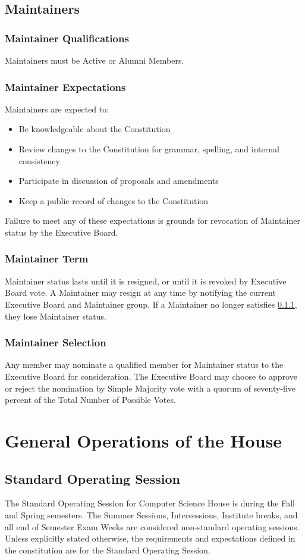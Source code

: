 \documentclass{article}
\newcommand{\article}[1]{\section{#1} \label{#1}}
\newcommand{\asection}[1]{\subsection{#1} \label{#1}}
\newcommand{\asubsection}[1]{\subsubsection{#1} \label{#1}}
\begin{document}
\asection{Maintainers}

\asubsection{Maintainer Qualifications}
Maintainers must be Active or Alumni Members.

\asubsection{Maintainer Expectations}
Maintainers are expected to:
\begin{itemize}
	\item Be knowledgeable about the Constitution
	\item Review changes to the Constitution for grammar, spelling, and internal consistency
	\item Participate in discussion of proposals and amendments
	\item Keep a public record of changes to the Constitution
\end{itemize}
Failure to meet any of these expectations is grounds for revocation of Maintainer status by the Executive Board.

\asubsection{Maintainer Term}
Maintainer status lasts until it is resigned, or until it is revoked by Executive Board vote.
A Maintainer may resign at any time by notifying the current Executive Board and Maintainer group.
If a Maintainer no longer satisfies \ref{Maintainer Qualifications}, they lose Maintainer status.

\asubsection{Maintainer Selection}
Any member may nominate a qualified member for Maintainer status to the Executive Board for consideration.
The Executive Board may choose to approve or reject the nomination by Simple Majority vote with a quorum of seventy-five percent of the Total Number of Possible Votes.

\article{General Operations of the House}
\asection{Standard Operating Session}
The Standard Operating Session for Computer Science House is during the Fall and Spring semesters.
The Summer Sessions, Intersessions, Institute breaks, and all end of Semester Exam Weeks are considered non-standard operating sessions.
Unless explicitly stated otherwise, the requirements and expectations defined in the constitution are for the Standard Operating Session.
\end{document}
